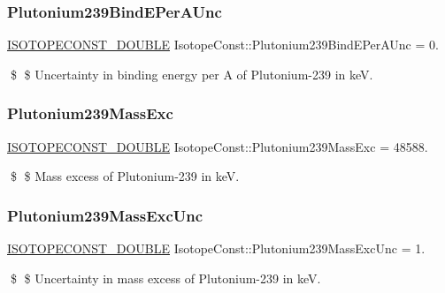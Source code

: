 \subsubsection{\texorpdfstring{Plutonium239\+Bind\+E\+Per\+A\+Unc}{Plutonium239BindEPerAUnc}}
{\footnotesize\ttfamily \mbox{\hyperlink{group___isotope_const-_macros_ga8f45a7272ce02c0b4c65c44636ed719a}{I\+S\+O\+T\+O\+P\+E\+C\+O\+N\+S\+T\+\_\+\+D\+O\+U\+B\+LE}} Isotope\+Const\+::\+Plutonium239\+Bind\+E\+Per\+A\+Unc = 0.}

\$ \$ Uncertainty in binding energy per A of Plutonium-\/239 in keV. \mbox{\label{group___isotope_const-_plutonium-_pu239_gabd025c012c1503f8269395e7ca1b0d6a}} 
\subsubsection{\texorpdfstring{Plutonium239\+Mass\+Exc}{Plutonium239MassExc}}
{\footnotesize\ttfamily \mbox{\hyperlink{group___isotope_const-_macros_ga8f45a7272ce02c0b4c65c44636ed719a}{I\+S\+O\+T\+O\+P\+E\+C\+O\+N\+S\+T\+\_\+\+D\+O\+U\+B\+LE}} Isotope\+Const\+::\+Plutonium239\+Mass\+Exc = 48588.}

\$ \$ Mass excess of Plutonium-\/239 in keV. \mbox{\label{group___isotope_const-_plutonium-_pu239_ga5b27b2ca868c35b4e366bbeff4273382}} 
\subsubsection{\texorpdfstring{Plutonium239\+Mass\+Exc\+Unc}{Plutonium239MassExcUnc}}
{\footnotesize\ttfamily \mbox{\hyperlink{group___isotope_const-_macros_ga8f45a7272ce02c0b4c65c44636ed719a}{I\+S\+O\+T\+O\+P\+E\+C\+O\+N\+S\+T\+\_\+\+D\+O\+U\+B\+LE}} Isotope\+Const\+::\+Plutonium239\+Mass\+Exc\+Unc = 1.}

\$ \$ Uncertainty in mass excess of Plutonium-\/239 in keV. \mbox{\label{group___isotope_const-_plutonium-_pu239_gae4c7f60c05472b7bf0629c597766409d}} 
